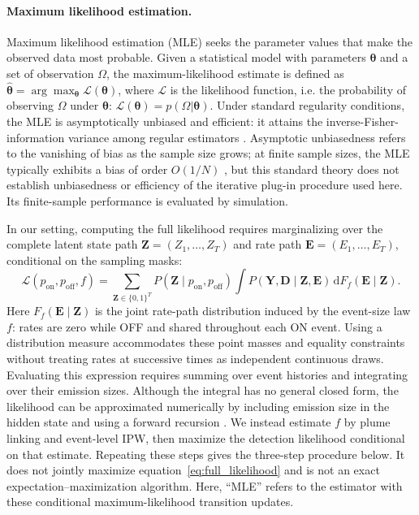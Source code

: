 \documentclass[numsec,webpdf,modern,mediumone]{oup-authoring-template}
\newcommand{\new}[1]{#1}
\begin{document}
\paragraph{Maximum likelihood estimation.}
Maximum likelihood estimation (MLE) seeks the parameter values that make the observed data most probable. Given a statistical model with parameters $\boldsymbol{\theta}$ and a set of observation $\Omega$, the maximum-likelihood estimate is defined as $\hat{\boldsymbol{\theta}} = \arg\max_{\boldsymbol{\theta}} \mathcal{L}(\boldsymbol{\theta})$, where $\mathcal{L}$ is the likelihood function, i.e. the probability of observing $\Omega$ under $\boldsymbol{\theta}$: $\mathcal{L}(\boldsymbol{\theta})=p(\Omega|\boldsymbol{\theta})$. Under standard regularity conditions, the MLE is asymptotically unbiased and efficient: it attains the inverse-Fisher-information variance among regular estimators \citep{vanderVaart1998}. \new{Asymptotic unbiasedness refers to the vanishing of bias as the sample size grows; at finite sample sizes, the MLE typically exhibits a bias of order $O(1/N)$ \citep[Ch.~5]{vanderVaart1998}, but this standard theory does not establish unbiasedness or efficiency of the iterative plug-in procedure used here. Its finite-sample performance is evaluated by simulation.}

In our setting, computing the full likelihood requires marginalizing over the complete latent state path $\mathbf Z=(Z_1,\ldots,Z_T)$ and rate path $\mathbf E=(E_1,\ldots,E_T)$, conditional on the sampling masks:
\begin{equation}
    \mathcal L(p_{\text{on}},p_{\text{off}},f)
    =\sum_{\mathbf Z\in\{0,1\}^T}
      P(\mathbf Z\mid p_{\text{on}},p_{\text{off}})
      \int P(\mathbf Y,\mathbf D\mid\mathbf Z,\mathbf E)
      \,\mathrm dF_f(\mathbf E\mid\mathbf Z).
    \label{eq:full_likelihood}
\end{equation}
Here $F_f(\mathbf E\mid\mathbf Z)$ is the joint rate-path distribution induced by the event-size law $f$: rates are zero while OFF and shared throughout each ON event. Using a distribution measure accommodates these point masses and equality constraints without treating rates at successive times as independent continuous draws.
Evaluating this expression requires summing over event histories and integrating over their emission sizes. Although the integral has no general closed form, the likelihood can be approximated numerically by including emission size in the hidden state and using a forward recursion \citep{LangrockKing2013}. We instead estimate $f$ by plume linking and event-level IPW, then maximize the detection likelihood conditional on that estimate. Repeating these steps gives the three-step procedure below. It does not jointly maximize equation~\eqref{eq:full_likelihood} and is not an exact expectation--maximization algorithm. Here, ``MLE'' refers to the estimator with these conditional maximum-likelihood transition updates.
\end{document}
